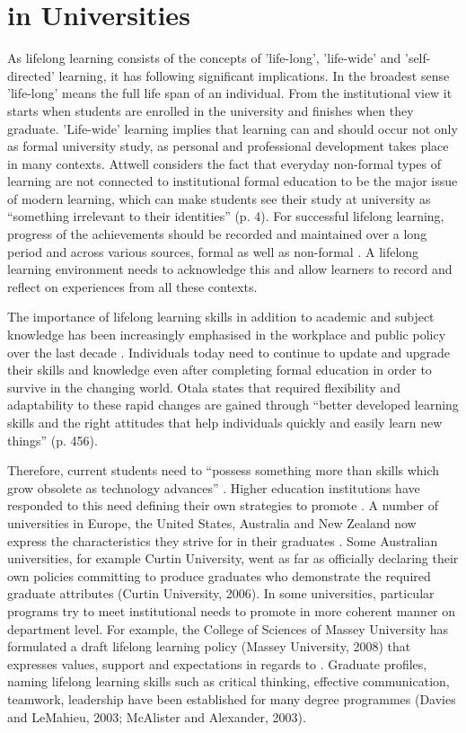 \section{\LLLc in Universities}

As lifelong learning consists of the concepts of 'life-long', 'life-wide' and
'self- directed' learning, it has following significant implications. In the
broadest sense 'life-long' means the full life span of an individual. From the
institutional view it starts when students are enrolled in the university and
finishes when they graduate. 'Life-wide' learning implies that learning can and
should occur not only as formal university study, as personal and professional
development takes place in many contexts. Attwell \citeyearpar{Attwell2007}
considers the fact that everyday non-formal types of learning are not connected
to institutional formal education to be the major issue of modern learning,
which can make students see their study at university as ``something irrelevant
to their identities'' (p. 4). For successful lifelong learning, progress of the
achievements should be recorded and maintained over a long period and across
various sources, formal as well as non-formal \citep{Kay2008}. A lifelong
learning environment needs to acknowledge this and allow learners to record and
reflect on experiences from all these contexts.

The importance of lifelong learning skills in addition to academic and subject
knowledge has been increasingly emphasised in the workplace and public policy
over the last decade \citep{Morgan-Klein2007,Sutherland2006}. Individuals today
need to continue to update and upgrade their skills and knowledge even after
completing formal education in order to survive in the changing world. Otala
\citeyearpar{Otala1997} states that required flexibility and adaptability to these
rapid changes are gained through ``better developed learning skills and the
right attitudes that help individuals quickly and easily learn new things'' (p.
456).

Therefore, current students need to ``possess something more than skills which
grow obsolete as technology advances'' \cite[p.~195]{Field2003}. Higher
education institutions have responded to this need defining their own strategies
to promote \LLLsn. A number of universities in Europe, the United
States, Australia and New Zealand now express the \LLLs characteristics they
strive for in their graduates \citep{Scanlon2006}. Some Australian universities,
for example Curtin University, went as far as officially declaring their own
policies committing to produce graduates who demonstrate the required graduate
attributes (Curtin University, 2006). In some universities, particular programs
try to meet institutional needs to promote \LLLsn in more coherent
manner on department level. For example, the College of Sciences of Massey
University has formulated a draft lifelong learning policy (Massey University,
2008) that expresses values, support and expectations in regards to \LLLsn.
Graduate profiles, naming lifelong learning skills such as critical thinking,
effective communication, teamwork, leadership have been established for many
degree programmes (Davies and LeMahieu, 2003; McAlister and Alexander, 2003).

